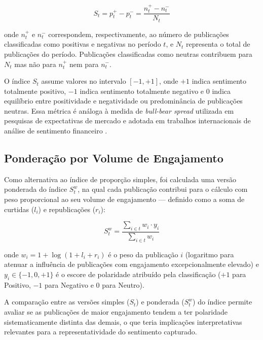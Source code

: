 \begin{equation}
	\label{eq:indice_sentimento}
	S_t = p_t^{+} - p_t^{-} = \frac{n_t^{+} - n_t^{-}}{N_t}
\end{equation}

\noindent onde $n_t^{+}$ e $n_t^{-}$ correspondem, respectivamente, ao número de publicações classificadas como positivas e negativas no período $t$, e $N_t$ representa o total de publicações do período. Publicações classificadas como neutras contribuem para $N_t$ mas não para $n_t^{+}$ nem para $n_t^{-}$.

O índice $S_t$ assume valores no intervalo $[-1, +1]$, onde $+1$ indica sentimento totalmente positivo, $-1$ indica sentimento totalmente negativo e $0$ indica equilíbrio entre positividade e negatividade ou predominância de publicações neutras. Essa métrica é análoga à medida de \textit{bull-bear spread} utilizada em pesquisas de expectativas de mercado e adotada em trabalhos internacionais de análise de sentimento financeiro \cite{tetlock2007,antweiler2004}.

\subsection{Ponderação por Volume de Engajamento}
\label{subsec:ponderacao_engajamento}

Como alternativa ao índice de proporção simples, foi calculada uma versão ponderada do índice $S_t^w$, na qual cada publicação contribui para o cálculo com peso proporcional ao seu volume de engajamento — definido como a soma de curtidas ($l_i$) e republicações ($r_i$):

\begin{equation}
	\label{eq:indice_ponderado}
	S_t^{w} = \frac{\displaystyle\sum_{i \in t} w_i \cdot y_i} {\displaystyle\sum_{i \in t} w_i}
\end{equation}

\noindent onde $w_i = 1 + \log(1 + l_i + r_i)$ é o peso da publicação $i$ (logaritmo para atenuar a influência de publicações com engajamento excepcionalmente elevado) e $y_i \in \{-1, 0, +1\}$ é o escore de polaridade atribuído pela classificação ($+1$ para Positivo, $-1$ para Negativo e $0$ para Neutro).

A comparação entre as versões simples ($S_t$) e ponderada ($S_t^w$) do índice permite avaliar se as publicações de maior engajamento tendem a ter polaridade sistematicamente distinta das demais, o que teria implicações interpretativas relevantes para a representatividade do sentimento capturado.


